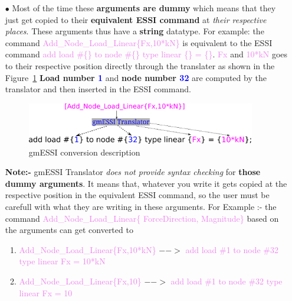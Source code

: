\documentclass[11pt]{article}
\begin{document}
\begin{itemize}
\begin{itemize}
    \item[$\bullet$]  Most  of the time these \textbf{arguments are dummy} which
    means that they just get copied to their \textbf{equivalent ESSI command} at
    \textit{their    respective   places}.   These   arguments   thus   have   a
    \textbf{string}       datatype.      For      example:      the      command
    \textcolor{violet}{Add\_Node\_Load\_Linear\{Fx,10*kN\}} is equivalent to the
    ESSI  command  \textcolor{violet}{add load \#\{\} to node \#\{\} type linear
    \{\}  =  \{\}}. \textcolor{violet}{Fx} and \textcolor{violet}{10*kN} goes to
    their  respective  position  directly through the translater as shown in the
    Figure~\ref{gmESSI-conversion}  \textbf{Load number \textcolor{blue}{1}} and
    \textbf{node number \textcolor{blue}{32}} are computed by the translator and
    then inserted in the ESSI command.

    \begin{figure}[!h]
      \includegraphics[width=10cm]{Images/gmESSIArguments.png}
      \centering
      \caption{\label{gmESSI-conversion} gmESSI conversion description}
    \end{figure}

    \textbf{Note:-}  gmESSI Translator \textit{does not provide syntax checking}
    for  \textbf{those  dummy  arguments}.  It means that, whatever you write it
    gets  copied  at  the respective position in the equivalent ESSI command, so
    the user must be carefull with what they are writing in these arguments. For
    Example                   :-                   the                   command
    \textcolor{violet}{Add\_Node\_Load\_Linear\{ ForceDirection, Magnitude\}}    
    based on the arguments can get converted to


    \begin{enumerate}

       \item      {\textcolor{violet}{Add\_Node\_Load\_Linear\{Fx,10*kN\}}  $-->$
       \textcolor{violet}{add load \#1 to node \#32 type linear Fx = 10*kN}}
       
       \item   {\textcolor{violet}{Add\_Node\_Load\_Linear\{Fx,10\}}        $-->$
       \textcolor{violet}{add load \#1 to node \#32 type linear Fx = 10}}
       

\end{enumerate}
\end{itemize}
\end{itemize}
\end{document}
